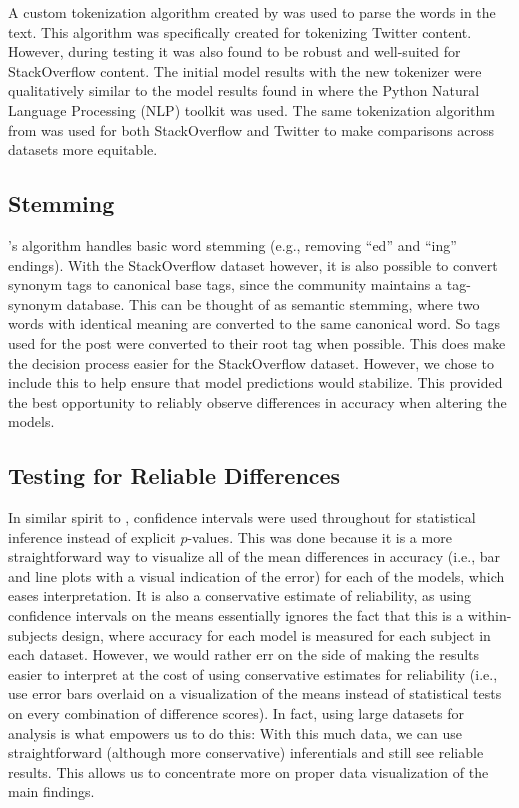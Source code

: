 \documentclass[man,floatsintext,donotrepeattitle]{apa6}
\begin{document}
A custom tokenization algorithm created by \textcite{Owoputi2013} was used to parse the words in the text.
This algorithm was specifically created for tokenizing Twitter content.
However, during testing it was also found to be robust and well-suited for StackOverflow content.
The initial model results with the new tokenizer were qualitatively similar to the model results found in \textcite{Stanley2013} where the Python Natural Language Processing (NLP) toolkit \parencite{Bird2009} was used.
The same tokenization algorithm from \textcite{Owoputi2013} was used for both StackOverflow and Twitter to make comparisons across datasets more equitable.

\subsection{Stemming}

\textcite{Owoputi2013}'s algorithm handles basic word stemming (e.g., removing ``ed'' and ``ing'' endings).
With the StackOverflow dataset however, it is also possible to convert synonym tags to canonical base tags, since the community maintains a tag-synonym database.
This can be thought of as semantic stemming, where two words with identical meaning are converted to the same canonical word.
So tags used for the post were converted to their root tag when possible.
This does make the decision process easier for the StackOverflow dataset.
However, we chose to include this to help ensure that model predictions would stabilize.
This provided the best opportunity to reliably observe differences in accuracy when altering the models. 

\subsection{Testing for Reliable Differences}

In similar spirit to \textcites{masson2003using, tryon2001evaluating, cumming2005inference}, confidence intervals were used throughout for statistical inference instead of explicit $p$-values.
This was done because it is a more straightforward way to visualize all of the mean differences in accuracy (i.e., bar and line plots with a visual indication of the error) for each of the models, which eases interpretation.
It is also a conservative estimate of reliability, as using confidence intervals on the means essentially ignores the fact that this is a within-subjects design, where accuracy for each model is measured for each subject in each dataset.
However, we would rather err on the side of making the results easier to interpret at the cost of using conservative estimates for reliability
(i.e., use error bars overlaid on a visualization of the means instead of statistical tests on every combination of difference scores).
In fact, using large datasets for analysis is what empowers us to do this:
With this much data, we can use straightforward (although more conservative) inferentials and still see reliable results.
This allows us to concentrate more on proper data visualization of the main findings.
\end{document}
